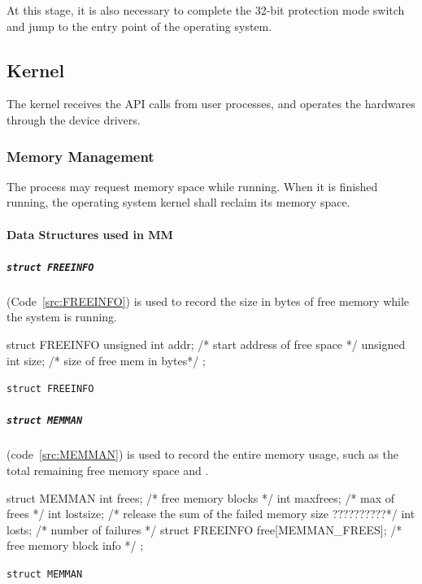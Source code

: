 \documentclass{swfcthesis}
\begin{document}
At this stage, it is also necessary to complete the 32-bit protection mode switch and jump
to the entry point of the operating system.

\subsection{Kernel}
\label{sec:kernel}

The kernel receives the API calls from user processes, and operates the
hardwares through the device drivers.

\subsubsection{Memory Management}
\label{sec:memory-management-1}

The process may request memory space while running. When it is finished running, the
operating system kernel shall reclaim its memory space. %

\paragraph{Data Structures used in MM}

\subparagraph{\texttt{struct FREEINFO}}

(Code~\ref{src:FREEINFO}) is used to record the size in bytes of free memory while the
system is running.

\begin{listing}[H]
  \begin{codeblock}
\begin{ccode}
struct FREEINFO
{ 
  unsigned int addr; /* start address of free space */
  unsigned int size; /* size of free mem in bytes*/
};
\end{ccode}
  \end{codeblock}
  \caption{\texttt{struct FREEINFO}}\label{src:FREEINFO}
\end{listing}

\subparagraph{\texttt{struct MEMMAN}} (code~\ref{src:MEMMAN}) is used to record the entire
memory usage, such as the total remaining free memory space and .

\begin{listing}[H]
  \begin{codeblock}
\begin{ccode}
struct MEMMAN
{ 
  int frees;    /* free memory blocks */
  int maxfrees; /* max of frees */
  int lostsize; /* release the sum of the failed memory size ??????????*/
  int losts;    /* number of failures */
  struct FREEINFO free[MEMMAN_FREES]; /* free memory block info */
};
\end{ccode}
  \end{codeblock}
  \caption{\texttt{struct MEMMAN}}\label{src:MEMMAN}
\end{listing}
\end{document}
